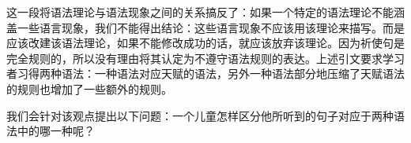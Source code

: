 这一段将语法理论与语法现象之间的关系搞反了：如果一个特定的语法理论不能涵盖一些语言现象，我们不能得出结论：这些语言现象不应该用该理论来描写。而是应该改建该语法理论，如果不能修改成功的话，就应该放弃该理论。因为祈使句是完全规则的，所以没有理由将其认定为不遵守语法规则的表达。上述引文要求学习者习得两种语法：一种语法对应天赋的语法，另外一种语法部分地压缩了天赋语法的规则也增加了一些额外的规则。

我们会针对该观点提出以下问题：一个儿童怎样区分他所听到的句子对应于两种语法中的哪一种呢？


